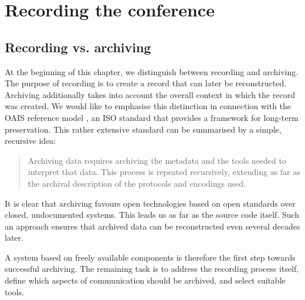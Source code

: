 \chapter{Recording the conference}

\section{Recording vs. archiving}

At the beginning of this chapter, we distinguish between recording and archiving. The purpose of recording is to create a record that can later be reconstructed. Archiving additionally takes into account the overall context in which the record was created. We would like to emphasise this distinction in connection with the OAIS reference model \cite{OAIS-RM}, an ISO standard that provides a framework for long-term preservation. This rather extensive standard can be summarised by a simple, recursive idea:

\begin{quote}
Archiving data requires archiving the metadata and the tools needed to interpret that data. This process is repeated recursively, extending as far as the archival description of the protocols and encodings used.
\end{quote}

It is clear that archiving favours open technologies based on open standards over closed, undocumented systems. This leads us as far as the source code itself. Such an approach ensures that archived data can be reconstructed even several decades later.

A system based on freely available components is therefore the first step towards successful archiving. The remaining task is to address the recording process itself, define which aspects of communication should be archived, and select suitable tools.

